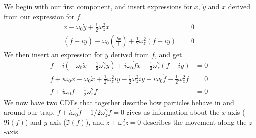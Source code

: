 %
We begin with our first component, and insert expressions for $\ddot x$, $\dot y$ and $x$ derived from our expression for $f$.
%
\begin{align*}
\ddot x - \omega_0 \dot y + \frac{1}{2} \omega_z^2 x &= 0 \\
\left( \ddot f - i \ddot y \right) - \omega_0 \left( \frac{\dot f \dot x}{i} \right) + \frac{1}{2} \omega_z^2 \left( f - iy \right) &= 0
\end{align*}
%
We then insert an expression for $\ddot y$ derived from $f$, and get
%
\begin{align*}
\ddot f - i \left( - \omega_0 \dot x + \frac{1}{2} \omega_z^2 y \right) + i \omega_0 \dot f \dot x + \frac{1}{2} \omega_z^2 \left( f - iy \right) &= 0 \\
\ddot f + i \omega_0 \dot x - \omega_0 \dot x + \frac{1}{2} \omega_z^2 i y - \frac{1}{2} \omega_z^2 i y + i \omega_0 \dot f - \frac{1}{2} \omega_z^2 f &= 0 \\
\ddot f + i \omega_0 \dot f - \frac{1}{2} \omega_z^2 f &= 0
\end{align*}
%
We now have two ODEs that together describe how particles behave in and around our trap. $\ddot f + i \omega_0 \dot f - 1/2 \omega_z^2 f = 0$ gives us information about the $x$-axis ($\Re(f)$) and $y$-axis ($\Im(f)$), and $\ddot z + \omega_z^2 z = 0$ describes the movement along the $z$-axis.

